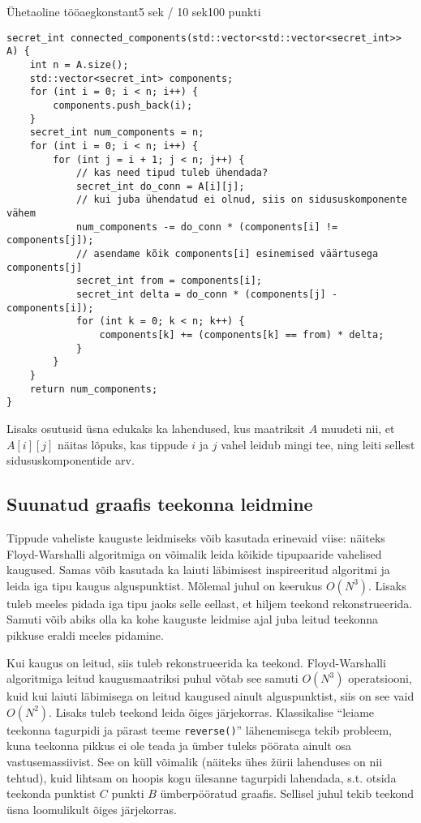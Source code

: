 \begin{yl}{7}{Ühetaoline tööaeg}{konstant}{5 sek / 10 sek}{100 punkti}
  \begin{lstlisting}
secret_int connected_components(std::vector<std::vector<secret_int>> A) {
    int n = A.size();
    std::vector<secret_int> components;
    for (int i = 0; i < n; i++) {
        components.push_back(i);
    }
    secret_int num_components = n;
    for (int i = 0; i < n; i++) {
        for (int j = i + 1; j < n; j++) {
            // kas need tipud tuleb ühendada?
            secret_int do_conn = A[i][j];
            // kui juba ühendatud ei olnud, siis on sidususkomponente vähem
            num_components -= do_conn * (components[i] != components[j]);
            // asendame kõik components[i] esinemised väärtusega components[j]
            secret_int from = components[i];
            secret_int delta = do_conn * (components[j] - components[i]);
            for (int k = 0; k < n; k++) {
                components[k] += (components[k] == from) * delta;
            }
        }
    }
    return num_components;
}
  \end{lstlisting}

  Lisaks osutusid üsna edukaks ka lahendused, kus maatriksit $A$ muudeti nii, et $A[i][j]$ näitas lõpuks, kas tippude $i$ ja $j$ vahel leidub mingi tee, ning leiti sellest sidususkomponentide arv.

  \subsection*{Suunatud graafis teekonna leidmine}

  Tippude vaheliste kauguste leidmiseks võib kasutada erinevaid viise: näiteks Floyd-Warshalli algoritmiga on võimalik leida kõikide tipupaaride vahelised kaugused. Samas võib kasutada ka laiuti läbimisest inspireeritud algoritmi ja leida iga tipu kaugus alguspunktist. Mõlemal juhul on keerukus $O(N^3)$. Lisaks tuleb meeles pidada iga tipu jaoks selle eellast, et hiljem teekond rekonstrueerida. Samuti võib abiks olla ka kohe kauguste leidmise ajal juba leitud teekonna pikkuse eraldi meeles pidamine.

  Kui kaugus on leitud, siis tuleb rekonstrueerida ka teekond. Floyd-Warshalli algoritmiga leitud kaugusmaatriksi puhul võtab see samuti $O(N^3)$ operatsiooni, kuid kui laiuti läbimisega on leitud kaugused ainult alguspunktist, siis on see vaid $O(N^2)$. Lisaks tuleb teekond leida õiges järjekorras. Klassikalise ``leiame teekonna tagurpidi ja pärast teeme \verb'reverse()''' lähenemisega tekib probleem, kuna teekonna pikkus ei ole teada ja ümber tuleks pöörata ainult osa vastusemassiivist. See on küll võimalik (näiteks ühes žürii lahenduses on nii tehtud), kuid lihtsam on hoopis kogu ülesanne tagurpidi lahendada, s.t. otsida teekonda punktist $C$ punkti $B$ ümberpööratud graafis. Sellisel juhul tekib teekond üsna loomulikult õiges järjekorras.


\end{yl}
